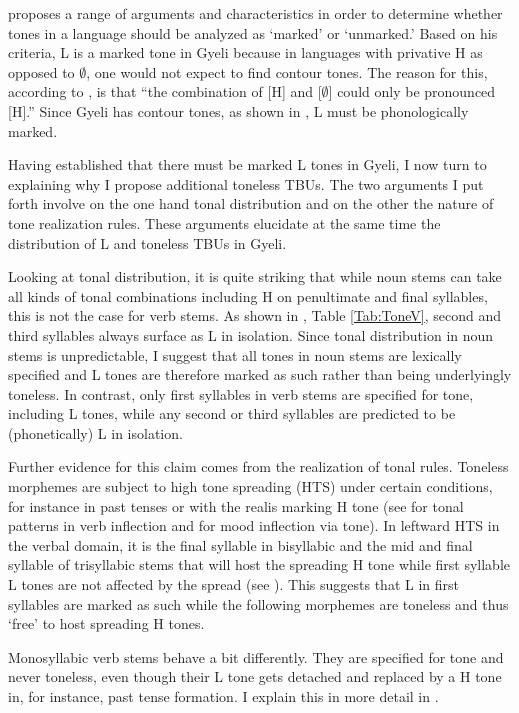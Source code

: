 \citet{hyman2001} proposes a range of arguments and characteristics in order to determine whether tones in a language should be analyzed as `marked' or `unmarked.' Based on his criteria, L is a marked tone in Gyeli because in languages with privative H as opposed to $\emptyset$, one would not expect to find contour tones. The reason for this, according to \citet[240]{hyman2001}, is that  ``the combination of [H] and [$\emptyset$] could only be pronounced [H].'' Since Gyeli has contour tones, as shown in , L must be phonologically marked.

Having established that there must be marked L tones in Gyeli, I now turn to explaining why I propose additional toneless TBUs. The two arguments I put forth involve on the one hand tonal distribution and on the other the nature of tone realization rules. These arguments elucidate at the same time the distribution of L and toneless TBUs in Gyeli.

Looking at tonal distribution, it is quite striking that while noun stems can take all kinds of tonal combinations including H on penultimate and final syllables, this is not the case for verb stems. As shown in , Table \ref{Tab:ToneV}, second and third syllables always surface as L in isolation. Since tonal distribution in noun stems is unpredictable, I suggest that all tones in noun stems are lexically specified and L tones are therefore marked as such rather than being underlyingly toneless. In contrast, only first syllables in verb stems are specified for tone, including L tones, while any second or third syllables are predicted to be (phonetically) L in isolation.

 Further evidence for this claim comes from the realization of tonal rules. Toneless morphemes are subject to high tone spreading (HTS) under certain conditions, for instance in past tenses or with the realis marking H tone (see  for tonal patterns in verb inflection and  for mood inflection via tone). In leftward HTS in the verbal domain, it is the final syllable in bisyllabic and the mid and final syllable of trisyllabic stems that will host the spreading H tone while first syllable L tones are not affected by the spread (see ). This suggests that L in first syllables are marked as such while the following morphemes are toneless and thus `free' to host spreading H tones.

Monosyllabic verb stems behave a bit differently. They are specified for tone and never toneless, even though their L tone gets detached and replaced by a H tone in, for instance, past tense formation. I explain this in more detail in . 

